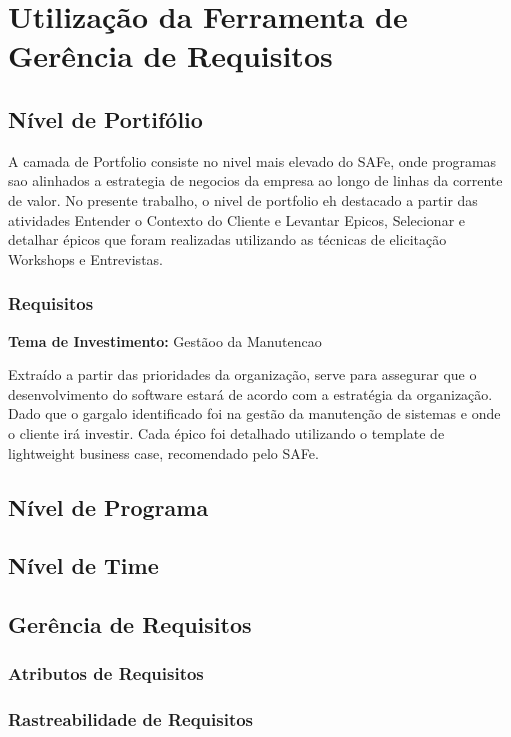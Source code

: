\chapter[Utilização da Ferramenta de Gerência de Requisitos]{Utilização da Ferramenta de Gerência de Requisitos}

\section{Nível de Portifólio}

A camada de Portfolio consiste no nivel mais elevado do SAFe, onde programas sao alinhados a estrategia de negocios da empresa ao longo de linhas da corrente de valor. No presente trabalho, o nivel de portfolio eh destacado a partir das atividades Entender o Contexto do Cliente e Levantar Epicos, Selecionar e detalhar épicos que foram realizadas utilizando as técnicas de elicitação Workshops e Entrevistas.

\subsection{Requisitos}

\textbf{Tema de Investimento:} Gestãoo da Manutencao

Extraído a partir das prioridades da organização, serve para assegurar que o desenvolvimento do software estará de acordo com a estratégia da organização. Dado que o gargalo identificado foi na gestão da manutenção de sistemas e onde o cliente irá investir.  Cada épico foi detalhado utilizando o template de lightweight business case, recomendado pelo SAFe. 

\section{Nível de Programa}

\section{Nível de Time}

\section{Gerência de Requisitos}

\subsection{Atributos de Requisitos}

\subsection{Rastreabilidade de Requisitos}